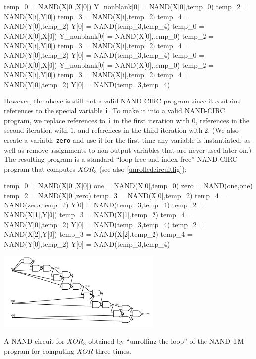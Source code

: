\begin{code}
temp_0 = NAND(X[0],X[0])
Y_nonblank[0] = NAND(X[0],temp_0)
temp_2 = NAND(X[i],Y[0])
temp_3 = NAND(X[i],temp_2)
temp_4 = NAND(Y[0],temp_2)
Y[0] = NAND(temp_3,temp_4)
temp_0 = NAND(X[0],X[0])
Y_nonblank[0] = NAND(X[0],temp_0)
temp_2 = NAND(X[i],Y[0])
temp_3 = NAND(X[i],temp_2)
temp_4 = NAND(Y[0],temp_2)
Y[0] = NAND(temp_3,temp_4)
temp_0 = NAND(X[0],X[0])
Y_nonblank[0] = NAND(X[0],temp_0)
temp_2 = NAND(X[i],Y[0])
temp_3 = NAND(X[i],temp_2)
temp_4 = NAND(Y[0],temp_2)
Y[0] = NAND(temp_3,temp_4)
\end{code}

However, the above is still not a valid NAND-CIRC program since it
contains references to the special variable \texttt{i}. To make it into
a valid NAND-CIRC program, we replace references to \texttt{i} in the
first iteration with \(0\), references in the second iteration with
\(1\), and references in the third iteration with \(2\). (We also create
a variable \texttt{zero} and use it for the first time any variable is
instantiated, as well as remove assignments to non-output variables that
are never used later on.) The resulting program is a standard ``loop
free and index free'' NAND-CIRC program that computes
\(\ensuremath{\mathit{XOR}}_3\) (see also \cref{unrolledcircuitfig}):

\begin{code}
temp_0 = NAND(X[0],X[0])
one = NAND(X[0],temp_0)
zero = NAND(one,one)
temp_2 = NAND(X[0],zero)
temp_3 = NAND(X[0],temp_2)
temp_4 = NAND(zero,temp_2)
Y[0] = NAND(temp_3,temp_4)
temp_2 = NAND(X[1],Y[0])
temp_3 = NAND(X[1],temp_2)
temp_4 = NAND(Y[0],temp_2)
Y[0] = NAND(temp_3,temp_4)
temp_2 = NAND(X[2],Y[0])
temp_3 = NAND(X[2],temp_2)
temp_4 = NAND(Y[0],temp_2)
Y[0] = NAND(temp_3,temp_4)
\end{code}


\begin{marginfigure}
\centering
\includegraphics[width=\linewidth, height=1.5in, keepaspectratio]{../figure/unrolled_circuit.png}
\caption{A NAND circuit for \(\ensuremath{\mathit{XOR}}_3\) obtained by
``unrolling the loop'' of the NAND-TM program for computing
\(\ensuremath{\mathit{XOR}}\) three times.}
\label{unrolledcircuitfig}
\end{marginfigure}

